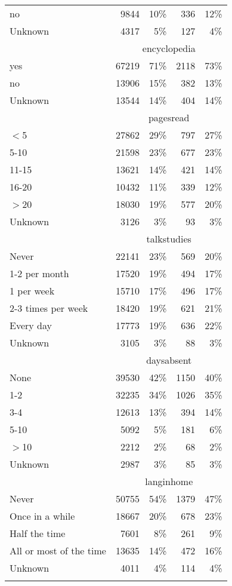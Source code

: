 \begin{longtable}{lrrrr}
  no & 9844 & 10\% & 336 & 12\% \\ 
  Unknown & 4317 & 5\% & 127 & 4\% \\ 
   \hline & \multicolumn{4}{c}{encyclopedia} \\ \cline{2-5} yes & 67219 & 71\% & 2118 & 73\% \\ 
  no & 13906 & 15\% & 382 & 13\% \\ 
  Unknown & 13544 & 14\% & 404 & 14\% \\ 
   \hline & \multicolumn{4}{c}{pagesread} \\ \cline{2-5} $<$5 & 27862 & 29\% & 797 & 27\% \\ 
  5-10 & 21598 & 23\% & 677 & 23\% \\ 
  11-15 & 13621 & 14\% & 421 & 14\% \\ 
  16-20 & 10432 & 11\% & 339 & 12\% \\ 
  $>$20 & 18030 & 19\% & 577 & 20\% \\ 
  Unknown & 3126 & 3\% &  93 & 3\% \\ 
   \hline & \multicolumn{4}{c}{talkstudies} \\ \cline{2-5} Never & 22141 & 23\% & 569 & 20\% \\ 
  1-2 per month & 17520 & 19\% & 494 & 17\% \\ 
  1 per week & 15710 & 17\% & 496 & 17\% \\ 
  2-3 times per week & 18420 & 19\% & 621 & 21\% \\ 
  Every day & 17773 & 19\% & 636 & 22\% \\ 
  Unknown & 3105 & 3\% &  88 & 3\% \\ 
   \hline & \multicolumn{4}{c}{daysabsent} \\ \cline{2-5} None & 39530 & 42\% & 1150 & 40\% \\ 
  1-2 & 32235 & 34\% & 1026 & 35\% \\ 
  3-4 & 12613 & 13\% & 394 & 14\% \\ 
  5-10 & 5092 & 5\% & 181 & 6\% \\ 
  $>$10 & 2212 & 2\% &  68 & 2\% \\ 
  Unknown & 2987 & 3\% &  85 & 3\% \\ 
   \hline & \multicolumn{4}{c}{langinhome} \\ \cline{2-5} Never & 50755 & 54\% & 1379 & 47\% \\ 
  Once in a while & 18667 & 20\% & 678 & 23\% \\ 
  Half the time & 7601 & 8\% & 261 & 9\% \\ 
  All or most of the time & 13635 & 14\% & 472 & 16\% \\ 
  Unknown & 4011 & 4\% & 114 & 4\% \\ 
  \hline
\label{g8mathstudent}
\end{longtable}
